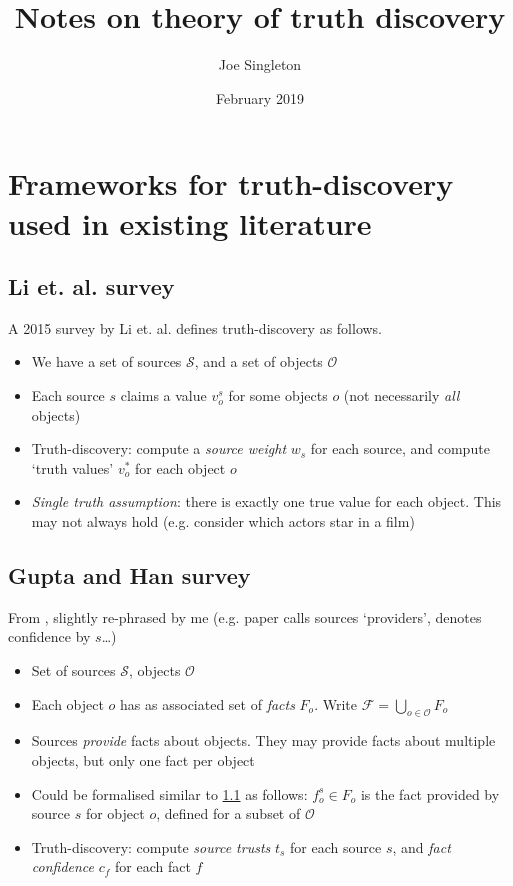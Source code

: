 \documentclass{article}
\date{February 2019}
\author{Joe Singleton}
\title{
    Notes on theory of truth discovery
}
\theoremstyle{definition} \newtheorem{definition}{Definition}
\theoremstyle{definition} \newtheorem{example}{Example}
\theoremstyle{plain} \newtheorem{axiom}{Axiom}
\theoremstyle{plain} \newtheorem*{remark}{Remark}
\theoremstyle{remark} \newtheorem*{notation}{Notation}
\theoremstyle{plain} \newtheorem{lemma}{Lemma}
\theoremstyle{plain} \newtheorem{proposition}{Proposition}
\renewcommand{\S}{\mathcal{S}}  %
\renewcommand{\O}{\mathcal{O}}  %
\newcommand{\F}{\mathcal{F}}
\begin{document}
\maketitle

\section{Frameworks for truth-discovery used in existing literature}
\label{sec:existing_frameworks}

\subsection{Li et. al. survey}
\label{sec:li}

A 2015 survey by Li et. al. {\cite{li_survey}} defines truth-discovery as
follows.

\begin{itemize}
\item We have a set of sources $\S$, and a set of objects $\O$
\item Each source $s$ claims a value $v_{o}^{s}$ for some objects $o$ (not
necessarily \emph{all} objects)
\item Truth-discovery: compute a \emph{source weight} $w_s$ for each source,
and compute `truth values' $v_{o}^{*}$ for each object $o$
\item \emph{Single truth assumption}: there is exactly one true value for each
object. This may not always hold (e.g. consider which actors star in a film)
\end{itemize}

\subsection{Gupta and Han survey}
\label{sec:gupta}

From \cite{gupta_han_survey}, slightly re-phrased by me (e.g. paper calls
sources `providers', denotes confidence by $s$\ldots)

\begin{itemize}
\item Set of sources $\S$, objects $\O$
\item Each object $o$ has as associated set of \emph{facts} $F_o$. Write
$\F = \bigcup_{o \in \O}F_o$
\item Sources \emph{provide} facts about objects. They may provide facts about
multiple objects, but only one fact per object
\item Could be formalised similar to \ref{sec:li} as follows: $f_o^s \in F_o$
is the fact provided by source $s$ for object $o$, defined for a subset of $\O$
\item Truth-discovery: compute \emph{source trusts} $t_s$ for each source $s$,
and \emph{fact confidence} $c_f$ for each fact $f$
\end{itemize}
\end{document}

